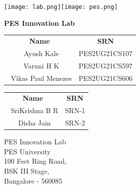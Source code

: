\documentclass[12pt]{report}
\begin{document}
 

\begin{titlepage}
\texttt{[image: lab.png]}\hfill \texttt{[image: pes.png]}

\begin{center}
\vspace*{1cm}

\textbf{\Large{PES Innovation Lab}}

\vspace{0.3cm}
\vspace{0.1cm}
       
       
\vspace{0.8cm}
            
\vspace{0.8cm}
       
\vspace{0.2cm}
       
\begin{tabular}{c c}    
    \textbf{Name} & 
    \textbf{SRN} \\[0.5cm]
    \ {Ayush Kale} & {PES2UG21CS107} \\
    \ {Varuni H K} & {PES2UG21CS597} \\
    \ {Vikas Paul Menezes} & {PES2UG21CS606} \\         
\end{tabular}
\vspace{0.5cm}

\vspace{0.2cm}
       
\begin{tabular}{c c}
    \textbf{Name} & 
    \textbf{SRN} \\[0.5cm]
    \ {SriKrishna B R} & {SRN-1} \\
    \ {Disha Jain} & {SRN-2} \\
\end{tabular}
       
\vfill
\vspace{0.5cm}
            
PES Innovation Lab\\
PES University\\
100 Feet Ring Road,\\
BSK III Stage,\\
Bangalore - 560085
            
\end{center}
\end{titlepage}
\end{document}
